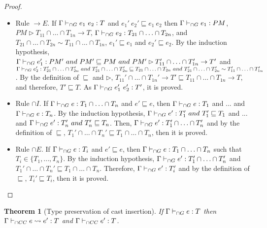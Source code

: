\documentclass[a4paper]{article}
\newtheorem{theorem}{Theorem}
\begin{document}
\begin{proof}
\begin{itemize}
    As $\Gamma \gits \lambda x : T_1' \cap \ldots \cap T_n'\ .\ e' : T_i' \rightarrow T'$, and by the definition of $\sqsubseteq$, $T_i' \rightarrow T' \sqsubseteq T_i \rightarrow T$, then it is proved.
    \item Rule ${\rightarrow} E$.
    If $\Gamma \vdash_{\cap G} e_1\ e_2 : T$ and $e_1'\ e_2' \sqsubseteq e_1\ e_2$ then $\Gamma \vdash_{\cap G} e_1 : PM$, $PM \rhd T_{11} \cap \ldots \cap T_{1n} \rightarrow T$, $\Gamma \vdash_{\cap G} e_2 : T_{21} \cap \ldots \cap T_{2n}$, and $T_{21} \cap \ldots \cap T_{2n} \sim T_{11} \cap \ldots \cap T_{1n}$, $e_1' \sqsubseteq e_1$ and $e_2' \sqsubseteq e_2$.
    By the induction hypothesis, $\Gamma \vdash_{\cap G} e_1' : PM'\ and\ PM' \sqsubseteq PM\ and\ PM' \rhd T_{11}' \cap \ldots \cap T_{1n}' \rightarrow T'$ and $\Gamma \vdash_{\cap G} e_2' : T_{21}' \cap \ldots \cap T_{2n}'\ and\ T_{21}' \cap \ldots \cap T_{2n}' \sqsubseteq T_{21} \cap \ldots \cap T_{2n}\ and\ T_{21}' \cap \ldots \cap T_{2n}' \sim T_{11}' \cap \ldots \cap T_{1n}'$.
    By the definition of $\sqsubseteq$ and $\rhd$, $T_{11}' \cap \ldots \cap T_{1n}' \rightarrow T' \sqsubseteq T_{11} \cap \ldots \cap T_{1n} \rightarrow T$, and therefore, $T' \sqsubseteq T$.
    As $\Gamma \vdash_{\cap G} e_1'\ e_2' : T'$, it is proved.
    \item Rule ${\cap} I$.
    If $\Gamma \vdash_{\cap G} e : T_1 \cap \ldots \cap T_n$ and $e' \sqsubseteq e$, then $\Gamma \vdash_{\cap G} e : T_1$ and ... and $\Gamma \vdash_{\cap G} e : T_n$.
    By the induction hypothesis, $\Gamma \gits e' : T_1'\ and\ T_1' \sqsubseteq T_1$ and ... and $\Gamma \vdash_{\cap G} e' : T_n'\ and\ T_n' \sqsubseteq T_n$.
    Then, $\Gamma \vdash_{\cap G} e' : T_1' \cap \ldots \cap T_n'$ and by the definition of $\sqsubseteq$, $T_1' \cap \ldots \cap T_n' \sqsubseteq T_1 \cap \ldots \cap T_n$, then it is proved.
    \item Rule ${\cap} E$.
    If $\Gamma \vdash_{\cap G} e : T_i$ and $e' \sqsubseteq e$, then $\Gamma \vdash_{\cap G} e : T_1 \cap \ldots \cap T_n$ such that $T_i \in \{T_1, ..., T_n\}$.
    By the induction hypothesis, $\Gamma \vdash_{\cap G} e' : T_1' \cap \ldots \cap T_n'$ and $T_1' \cap \ldots \cap T_n' \sqsubseteq T_1 \cap \ldots \cap T_n$.
    Therefore, $\Gamma \vdash_{\cap G} e' : T_i'$ and by the definition of $\sqsubseteq$, $T_i' \sqsubseteq T_i$, then it is proved.
\end{itemize}
\end{proof}

\begin{theorem}[Type preservation of cast insertion]
\label{type_preservation_cast_insertion}
If $\Gamma \vdash_{\cap G} e : T$ then $\Gamma \vdash_{\cap CC} e \leadsto e' : T$ and $\Gamma \vdash_{\cap CC} e' : T$.
\end{theorem}
\end{document}
